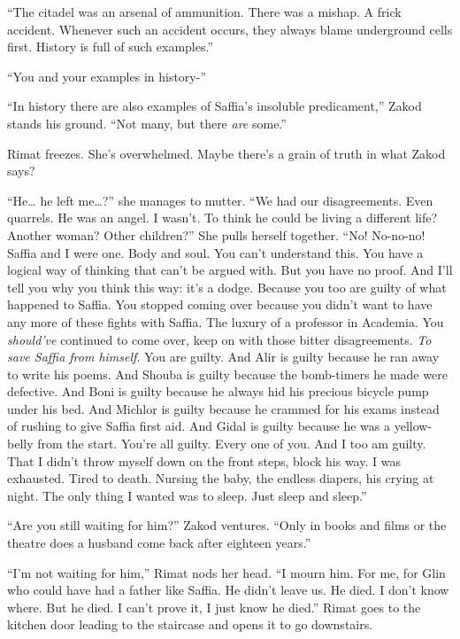 \documentclass[twoside,11pt]{book}
\begin{document}
``The citadel was an arsenal of ammunition. There was a mishap. A frick accident. Whenever such an accident
occurs, they always blame underground cells first. History is full of such examples.''

``You and your examples in history-''

``In history there are also examples of Saffia's insoluble predicament,'' Zakod stands his
ground. ``Not many, but there \textit{are} some.''

Rimat freezes. She's overwhelmed. Maybe there's a grain of truth in what Zakod says?

``He{\dots} he left me{\dots}?'' she manages to mutter. ``We had our disagreements. Even quarrels. He was
an angel. I wasn't. To think he could be living a different life? Another woman? Other children?'' She
pulls herself together. ``No! No-no-no! Saffia and I were one. Body and soul.  You can't understand this.
You have a logical way of thinking that can't be argued with. But you have no proof. And I'll tell you why you think
this way: it's a dodge. Because you too are guilty of what happened to Saffia. You stopped coming over because you
didn't want to have any more of these fights with Saffia. The luxury of a professor in Academia. You \textit{should've}
continued to come over, keep on with those bitter disagreements. \textit{To save Saffia from himself}. You are
guilty. And Alir is guilty because he ran away to write his poems. And Shouba is guilty because the bomb-timers he made
were defective. And Boni is guilty because he always hid his precious bicycle pump under his bed. And Michlor is guilty
because he crammed for his exams instead of rushing to give Saffia first aid. And Gidal is guilty because he was a
yellow-belly from the start. You're all guilty. Every one of you. And I too am guilty. That I didn't throw myself down
on the front steps, block his way. I was exhausted. Tired to death. Nursing the baby, the endless diapers, his crying
at night. The only thing I wanted was to sleep. Just sleep and sleep.''

``Are you still waiting for him?'' Zakod ventures. ``Only in books and films or
the theatre does a husband come back after eighteen years.''

``I'm not waiting for him,'' Rimat nods her head. ``I mourn him. For me, for Glin
who could have had a father like Saffia. He didn't leave us. He died. I don't know where. But he died. I can't prove
it, I just know he died.'' Rimat goes to the kitchen door leading to the staircase and opens it to go
downstairs.
\end{document}
